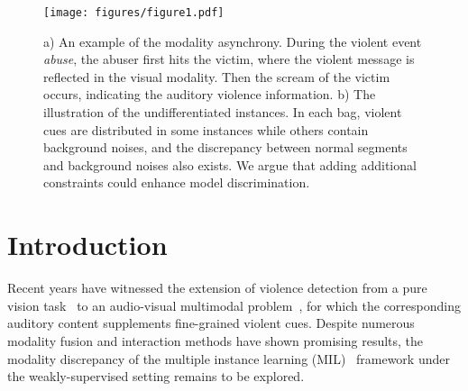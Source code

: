\documentclass[sigconf]{acmart}
\begin{document}

\maketitle

\renewcommand{\thefootnote}{\fnsymbol{footnote}}



\begin{figure}[htp]
\centering
\texttt{[image: figures/figure1.pdf]}
\vspace{-2mm}
\caption{a) An example of the modality asynchrony. During the violent event \textit{abuse}, the abuser first hits the victim, where the violent message is reflected in the visual modality. Then the scream of the victim occurs, indicating the auditory violence information. b) The illustration of the undifferentiated instances. In each bag, violent cues are distributed in some instances while others contain background noises, and the discrepancy between normal segments and background noises also exists. We argue that adding additional constraints could enhance model discrimination.}
\label{figure1}
\end{figure}

\section{Introduction}

Recent years have witnessed the extension of violence detection from a pure vision task~\cite{bermejo2011violence, deniz2014fast, zhang2019temporal, peixoto2019toward, zhang2016new, khan2019cover, feng2021mist, tian2021weakly, wu2021learning, ristea2021self, li2022self} to an audio-visual multimodal problem~\cite{wu2020not, peixoto2020multimodal, pang2021violence}, for which the corresponding auditory content supplements fine-grained violent cues. Despite numerous modality fusion and interaction methods have shown promising results, the modality discrepancy of the multiple instance learning (MIL)~\cite{maron1997framework} framework under the weakly-supervised setting remains to be explored.
\end{document}
